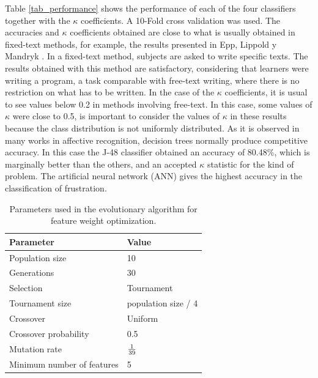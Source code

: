 \documentclass[a4paper,twoside]{article}
\begin{document}

Table \ref{tab_performance} shows the performance of each of the four
classifiers together
with the $\kappa$ coefficients. A 10-Fold cross validation was used.
The accuracies and $\kappa$ coefficients obtained are close to what is
usually obtained in fixed-text methods, for example, the results presented in
Epp, Lippold y Mandryk \cite{epp2011identifying}.
In a fixed-text method, subjects are asked to write specific texts.
The results obtained with this method are satisfactory, considering that
learners were writing a program, a task comparable with free-text writing,
where there is no restriction on what has to be written.
In the case of the $\kappa$ coefficients, it is
usual to see values below 0.2 in methods involving free-text. In this case, some
values of $\kappa$ were close to 0.5, is important to consider the values of $\kappa$
in these results because the class distribution is not uniformly distributed. As
it is observed in many works in affective recognition, decision trees normally
produce competitive accuracy. In this case the J-48 classifier obtained an
accuracy of 80.48\%, which is marginally better than the others, and an accepted $\kappa$
statistic for the kind of problem. The artificial neural network (ANN)
gives the highest
accuracy in the classification of frustration.
%
\begin{table}[h!tb]
\centering
\caption{Parameters used in the evolutionary algorithm for feature
  weight optimization.}
\label{tab_ga_w}
    \begin{tabular}{ | l | l | }
      \hline
      Parameter & Value \\
        \hline
      Population size & 10 \\
      Generations & 30 \\
      Selection & Tournament \\
      Tournament size & population size / 4 \\
      Crossover & Uniform \\
      Crossover probability & 0.5 \\
      Mutation rate & $1 \over 39$ \\
      Minimum number of features & 5 \\
        \hline
    \end{tabular}
  \end{table}
\end{document}
